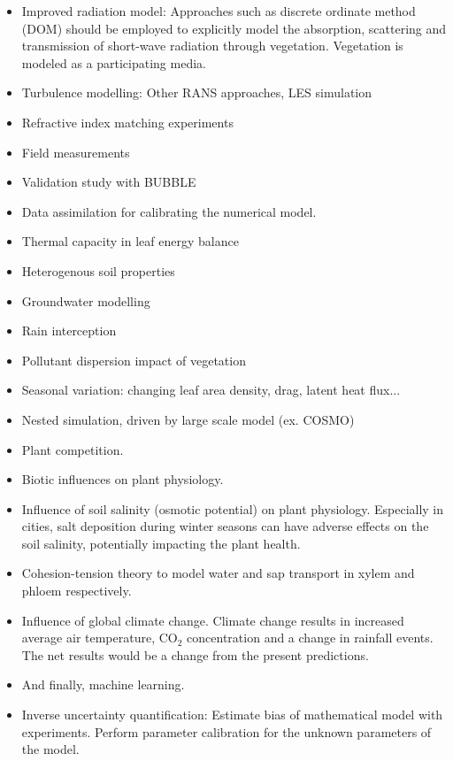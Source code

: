 \begin{itemize}
	\item Improved radiation model: Approaches such as discrete ordinate method (DOM) should be employed to explicitly model the absorption, scattering and transmission of short-wave radiation through vegetation. Vegetation is modeled as a participating media.
	\item Turbulence modelling: Other RANS approaches, LES simulation
	\item Refractive index matching experiments
	\item Field measurements
	\item Validation study with BUBBLE
	\item Data assimilation for calibrating the numerical model.
	\item Thermal capacity in leaf energy balance
	\item Heterogenous soil properties
	\item Groundwater modelling
	\item Rain interception
	\item Pollutant dispersion impact of vegetation
	\item Seasonal variation: changing leaf area density, drag, latent heat flux...
	\item Nested simulation, driven by large scale model (ex. COSMO)
	\item Plant competition.
	\item Biotic influences on plant physiology. 
	\item Influence of soil salinity (osmotic potential) on plant physiology. Especially in cities, salt deposition during winter seasons can have adverse effects on the soil salinity, potentially impacting the plant health. 
	\item Cohesion-tension theory to model water and sap transport in xylem and phloem respectively.
	\item Influence of global climate change. Climate change results in increased average air temperature, CO$_2$ concentration and a change in rainfall events. The net results would be a change from the present predictions. 
	\item And finally, machine learning.
	\item Inverse uncertainty quantification: Estimate bias of mathematical model with experiments. Perform parameter calibration for the unknown parameters of the model.  
\end{itemize}